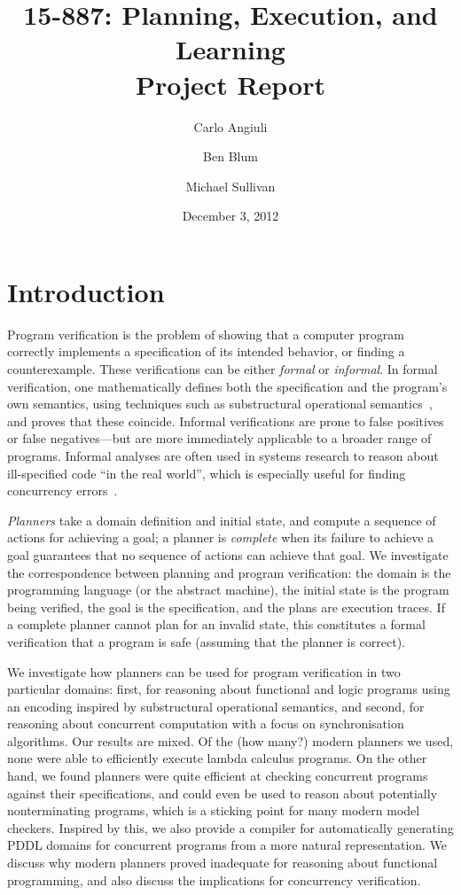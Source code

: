 \documentclass{article}
\title{
{\large 15-887: Planning, Execution, and Learning}\\
Project Report}
\author{Carlo Angiuli \and Ben Blum \and Michael Sullivan}
\date{December 3, 2012}
\begin{document}
\maketitle

\section{Introduction}

Program verification is the problem of showing that a computer program correctly
implements a specification of its intended behavior, or finding a
counterexample. These verifications can be either \emph{formal} or
\emph{informal}. In formal verification, one mathematically defines both the
specification and the program's own semantics, using techniques such as
substructural operational semantics~\cite{rob}, and proves that these coincide.
Informal verifications are prone to false positives or false negatives---but are
more immediately applicable to a broader range of programs. Informal analyses
are often used in systems research to reason about ill-specified code ``in the
real world'', which is especially useful for finding concurrency
errors~\cite{ben}.

{\em Planners} take a domain definition and initial state, and compute a
sequence of actions for achieving a goal; a planner is {\em complete} when its
failure to achieve a goal guarantees that no sequence of actions can achieve
that goal.
We investigate the correspondence between planning and program verification: the domain is the programming language (or the abstract machine), the initial state is the program being verified, the goal is the specification, and the plans are execution traces.
If a complete planner cannot plan for an invalid state, this constitutes a
formal verification that a program is safe (assuming that the planner is
correct).

We investigate how planners can be used for program verification in two particular domains:
first, for reasoning about functional and logic programs using an encoding
inspired by substructural operational semantics,
and second, for reasoning about concurrent computation with a focus on synchronisation algorithms.
Our results are mixed.
Of the (how many?) modern planners we used, none were able to efficiently execute lambda calculus programs. %
On the other hand, we found planners were quite efficient at checking concurrent programs against their specifications,
and could even be used to reason about potentially nonterminating programs, which is a sticking point for many modern model checkers. %
Inspired by this, we also provide a compiler for automatically generating PDDL
domains for concurrent programs from a more natural representation.
We discuss why modern planners proved inadequate for reasoning about functional programming, and also discuss the implications for concurrency verification.
\end{document}
